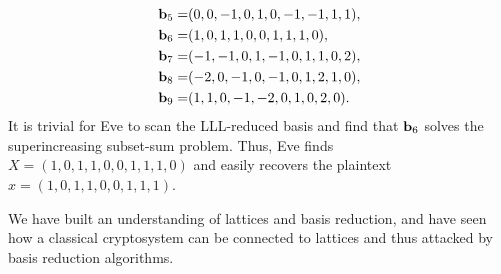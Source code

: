 \documentclass[a4paper,12pt]{article}
\begin{document}
\begin{ex}
\begin{align*}
        \mathbf{b}_5 =& ( 0,0,-1,0,1,0,-1,-1,1,1), \\ 
        \mathbf{b}_6 =& ( 1,0,1,1,0,0,1,1,1,0), \\ 
        \mathbf{b}_7 =& ( -1,-1,0,1,-1,0,1,1,0,2), \\ 
        \mathbf{b}_8 =& ( -2,0,-1,0,-1,0,1,2,1,0), \\
        \mathbf{b}_9 =& ( 1,1,0,-1,-2,0,1,0,2,0).
    \end{align*} 
    It is trivial for Eve to scan the LLL-reduced basis and find that $\mathbf{b}_6$ solves the superincreasing subset-sum problem. Thus, Eve finds $X=(1,0,1,1,0,0,1,1,1,0)$ and easily recovers the plaintext $x = (1,0,1,1,0,0,1,1,1)$.
\end{ex}

We have built an understanding of lattices and basis reduction, and have seen how a classical cryptosystem can be connected to lattices and thus attacked by basis reduction algorithms. 

\newpage

\end{document}
